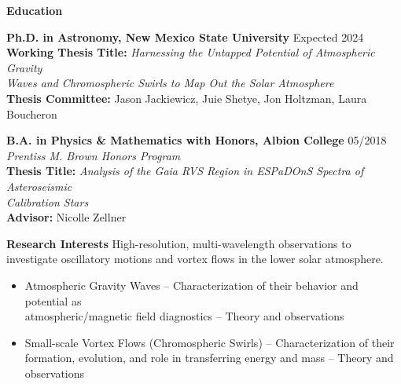\documentclass{resume} %
\begin{document}
\vspace{-0.1in}
\begin{rSection}{\textbf{Education}}
\vspace{0.02in}

{\bf Ph.D. in Astronomy, New Mexico State University} \hfill {Expected 2024}
\vspace{0.04in}
\\ 
{\bf Working Thesis Title:} 
\emph{Harnessing the Untapped Potential of Atmospheric Gravity \\ Waves and Chromospheric Swirls to Map Out the Solar Atmosphere}
\vspace{0.04in}
\\ 
{\bf Thesis Committee:} Jason Jackiewicz, Juie Shetye, Jon Holtzman, Laura Boucheron
\vspace{0.15in}

{\bf B.A. in Physics \& Mathematics with Honors, Albion College}  \hfill {05/2018}
\vspace{0.04in} \\
{\emph{Prentiss M. Brown Honors Program} }
\vspace{0.04in} \\
{\bf Thesis Title:} \emph{Analysis of the Gaia RVS Region in ESPaDOnS Spectra of Asteroseismic \\ Calibration Stars}
\vspace{0.04in}
\\ 
{\bf Advisor:} Nicolle Zellner 
\end{rSection}

\vspace{-0.1in}
\begin{rSection}{\textbf{Research Interests}}
\vspace{0.02in}
High-resolution, multi-wavelength observations to investigate oscillatory motions and vortex flows in the lower solar atmosphere.
\vspace{0.02in}
\begin{itemize}
    \item Atmospheric Gravity Waves -- Characterization of their behavior and potential as \\ atmospheric/magnetic field diagnostics -- Theory and observations
    \item Small-scale Vortex Flows (Chromospheric Swirls) -- 
    Characterization of their formation, evolution, and role in transferring energy and mass -- Theory and observations
\end{itemize}
\end{rSection}
\end{document}
